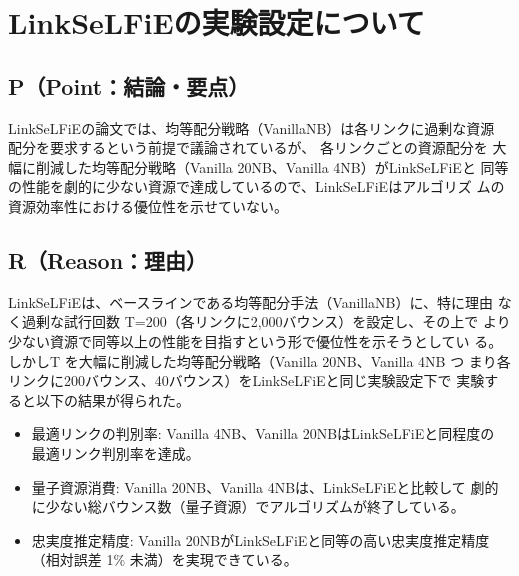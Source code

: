 \documentclass[technicalreport,dvipdfmx]{ieicej}
\begin{document}


\maketitle


\section{LinkSeLFiEの実験設定について}
\label{sec:org66cec4d}
\subsection{P（Point：結論・要点）}
\label{sec:orgcfa0c1d}
LinkSeLFiEの論文では、均等配分戦略（VanillaNB）は各リンクに過剰な資源
配分を要求するという前提で議論されているが、 各リンクごとの資源配分を
大幅に削減した均等配分戦略（Vanilla 20NB、Vanilla 4NB）がLinkSeLFiEと
同等の性能を劇的に少ない資源で達成しているので、LinkSeLFiEはアルゴリズ
ムの資源効率性における優位性を示せていない。

\subsection{R（Reason：理由）}
\label{sec:org9be3c92}
LinkSeLFiEは、ベースラインである均等配分手法（VanillaNB）に、特に理由
なく過剰な試行回数 T=200（各リンクに2,000バウンス）を設定し、その上で
より少ない資源で同等以上の性能を目指すという形で優位性を示そうとしてい
る。しかしT を大幅に削減した均等配分戦略（Vanilla 20NB、Vanilla 4NB つ
まり各リンクに200バウンス、40バウンス）をLinkSeLFiEと同じ実験設定下で
実験すると以下の結果が得られた。

\begin{itemize}
\item 最適リンクの判別率: Vanilla 4NB、Vanilla 20NBはLinkSeLFiEと同程度の
最適リンク判別率を達成。

\item 量子資源消費: Vanilla 20NB、Vanilla 4NBは、LinkSeLFiEと比較して
劇的に少ない総バウンス数（量子資源）でアルゴリズムが終了している。

\item 忠実度推定精度: Vanilla 20NBがLinkSeLFiEと同等の高い忠実度推定精度
（相対誤差 1\% 未満）を実現できている。
\end{itemize}
\end{document}

